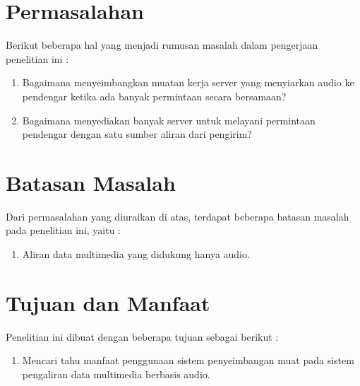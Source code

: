 \section{Permasalahan}
Berikut beberapa hal yang menjadi rumusan masalah dalam pengerjaan penelitian ini :
\begin{enumerate}
    \item Bagaimana menyeimbangkan muatan kerja server yang menyiarkan audio ke pendengar ketika ada banyak permintaan secara bersamaan?
    \item Bagaimana menyediakan banyak server untuk melayani permintaan pendengar dengan satu sumber aliran dari pengirim?

\end{enumerate}

\section{Batasan Masalah}
Dari permasalahan yang diuraikan di atas, terdapat beberapa batasan masalah pada penelitian ini, yaitu :
\begin{enumerate}
    \item Aliran data multimedia yang didukung hanya audio.
\end{enumerate}

\section{Tujuan dan Manfaat}
Penelitian ini dibuat dengan beberapa tujuan sebagai berikut :
\begin{enumerate}
\item Mencari tahu manfaat penggunaan sistem penyeimbangan muat pada sistem pengaliran data multimedia berbasis audio.
\end{enumerate}

